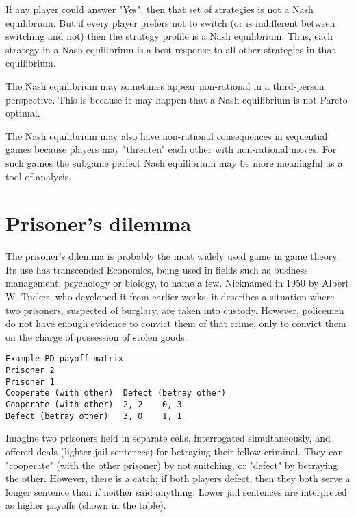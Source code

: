 \documentclass[]{report}
\begin{document}
If any player could answer "Yes", then that set of strategies is not a Nash equilibrium. But if every player prefers not to switch (or is indifferent between switching and not) then the strategy profile is a Nash equilibrium. Thus, each strategy in a Nash equilibrium is a best response to all other strategies in that equilibrium.

The Nash equilibrium may sometimes appear non-rational in a third-person perspective. This is because it may happen that a Nash equilibrium is not Pareto optimal.

The Nash equilibrium may also have non-rational consequences in sequential games because players may "threaten" each other with non-rational moves. For such games the subgame perfect Nash equilibrium may be more meaningful as a tool of analysis.




\newpage



\section{Prisoner’s dilemma}

The prisoner’s dilemma is probably the most widely used game in game theory. Its use has transcended Economics, being used in fields such as business management, psychology or biology, to name a few. Nicknamed in 1950 by Albert W. Tucker, who developed it from earlier works, it describes a situation where two prisoners, suspected of burglary, are taken into custody. However, policemen do not have enough evidence to convict them of that crime, only to convict them on the charge of possession of stolen goods.

\begin{verbatim}
Example PD payoff matrix
Prisoner 2
Prisoner 1
Cooperate (with other)	Defect (betray other)
Cooperate (with other)	2, 2	0, 3
Defect (betray other)	3, 0	1, 1
\end{verbatim}

Imagine two prisoners held in separate cells, interrogated simultaneously, and offered deals (lighter jail sentences) for betraying their fellow criminal. They can "cooperate" (with the other prisoner) by not snitching, or "defect" by betraying the other. However, there is a catch; if both players defect, then they both serve a longer sentence than if neither said anything. Lower jail sentences are interpreted as higher payoffs (shown in the table).
\end{document}
